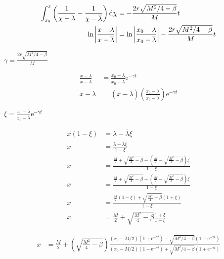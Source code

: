\begin{align*}
\int_{x_0}^{x} \left(\frac{1}{\chi - \lambda}-\frac{1}{\chi - \overline{\lambda}}\right)\mathrm{d} \chi &=-\frac{2r\sqrt{M^2/4-\beta}}{M}t \\
	\ln\left|\frac{x - \lambda}{x - \overline{\lambda}}\right|&=\ln\left|\frac{x_0- \lambda}{x_0 - \overline{\lambda}}\right|-\frac{2r\sqrt{M^2/4-\beta}}{M}t
\end{align*}
	
$\gamma=\frac{2r\sqrt{M^2/4-\beta}}{M}$

\begin{align}
\frac{x - \lambda}{x - \overline{\lambda}} &=\frac{x_0- \lambda}{x_0- \overline{\lambda}}\mathrm e^{-\gamma t} \\
x-\lambda &=\left(x-\overline{\lambda}\right)\left(\frac{x_0- \lambda}{x_0- \overline{\lambda}}\right)\mathrm e^{-\gamma t}
\end{align}

$\xi=\frac{x_0-\lambda}{x_0-\overline{\lambda}}\mathrm{e}^{-\gamma t}$

\begin{align*}
	x\left(1-\xi\right)&=\lambda-\overline{\lambda}\xi\\
	x&=\frac{\lambda-\overline{\lambda}\xi}{1-\xi} \\	
	x&=\frac{\frac{M}{2}+\sqrt{\frac{M^2}{4}-\beta}-\left(\frac{M}{2}-\sqrt{\frac{M^2}{4}-\beta}\right)\xi}{1-\xi}\\
	x&=\frac{\frac{M}{2}+\sqrt{\frac{M^2}{4}-\beta}-\left(\frac{M}{2}-\sqrt{\frac{M^2}{4}-\beta}\right)\xi}{1-\xi}\\
	x&=\frac{\frac{M}{2}\left(1-\xi\right)+\sqrt{\frac{M^2}{4}-\beta}\left(1+\xi\right)}{1-\xi}\\
	x&=\frac{M}{2}+\sqrt{\frac{M^2}{4}-\beta}\frac{1+\xi}{1-\xi}
\end{align*}

\begin{align}
	x&=\frac{M}{2}+\left(\sqrt{\frac{M^2}{4}-\beta}\right)\frac{\left(x_0-M/2\right)\left(1+\mathrm e^{-\gamma t}\right)-\sqrt{M^2/4-\beta}\left(1-\mathrm{e}^{-\gamma t}\right)}{\left(x_0-M/2\right)\left(1-\mathrm e^{-\gamma t}\right)+\sqrt{M^2/4-\beta}\left(1+\mathrm{e}^{-\gamma t}\right)}
\end{align}